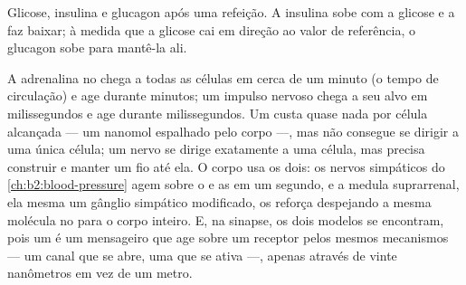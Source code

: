\begin{omfigure}

{\small Glicose, insulina e glucagon após uma refeição. A insulina sobe
com a glicose e a faz baixar; à medida que a glicose cai em direção ao
valor de referência, o glucagon sobe para mantê-la ali.}
\end{omfigure}

\begin{example}\label{ex:b2:cell-signalling:compare}
A adrenalina no  chega a todas as células em cerca de um minuto
(o tempo de circulação) e age durante minutos; um impulso nervoso chega
a seu alvo em milissegundos e age durante milissegundos. Um 
custa quase nada por célula alcançada --- um nanomol espalhado pelo
corpo ---, mas não consegue se dirigir a uma única célula; um nervo se
dirige exatamente a uma célula, mas precisa construir e manter um fio
até ela. O corpo usa os dois: os nervos simpáticos do \cref{ch:b2:blood-pressure} agem
sobre o  e as  em um segundo, e a medula suprarrenal,
ela mesma um gânglio simpático modificado, os reforça despejando a mesma
molécula no  para o corpo inteiro. E, na sinapse, os dois modelos
se encontram, pois um  é um mensageiro que age sobre um
receptor pelos mesmos mecanismos --- um canal que se abre, uma  que se ativa ---, apenas através de vinte nanômetros em vez de um
metro.
\end{example}

